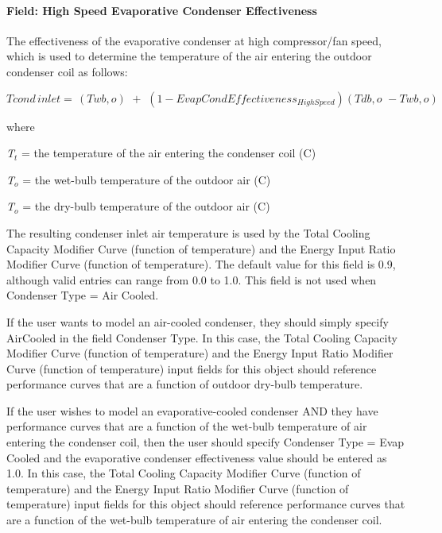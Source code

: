 \paragraph{Field: High Speed Evaporative Condenser Effectiveness}\label{field-high-speed-evaporative-condenser-effectiveness}

The effectiveness of the evaporative condenser at high compressor/fan speed, which is used to determine the temperature of the air entering the outdoor condenser coil as follows:

\begin{equation}
Tcond\,inlet = \,\left( {Twb,o} \right)\,\, + \,\,\left( {1 - EvapCondEffectivenes{s_{HighSpeed}}} \right)\left( {Tdb,o\,\, - Twb,o} \right)
\end{equation}

where

\emph{T\(_{t}\)} = the temperature of the air entering the condenser coil (C)

\emph{T\(_{o}\)} = the wet-bulb temperature of the outdoor air (C)

\emph{T\(_{o}\)} = the dry-bulb temperature of the outdoor air (C)

The resulting condenser inlet air temperature is used by the Total Cooling Capacity Modifier Curve (function of temperature) and the Energy Input Ratio Modifier Curve (function of temperature). The default value for this field is 0.9, although valid entries can range from 0.0 to 1.0. This field is not used when Condenser Type = Air Cooled.

If the user wants to model an air-cooled condenser, they should simply specify AirCooled in the field Condenser Type. In this case, the Total Cooling Capacity Modifier Curve (function of temperature) and the Energy Input Ratio Modifier Curve (function of temperature) input fields for this object should reference performance curves that are a function of outdoor dry-bulb temperature.

If the user wishes to model an evaporative-cooled condenser AND they have performance curves that are a function of the wet-bulb temperature of air entering the condenser coil, then the user should specify Condenser Type = Evap Cooled and the evaporative condenser effectiveness value should be entered as 1.0. In this case, the Total Cooling Capacity Modifier Curve (function of temperature) and the Energy Input Ratio Modifier Curve (function of temperature) input fields for this object should reference performance curves that are a function of the wet-bulb temperature of air entering the condenser coil.

